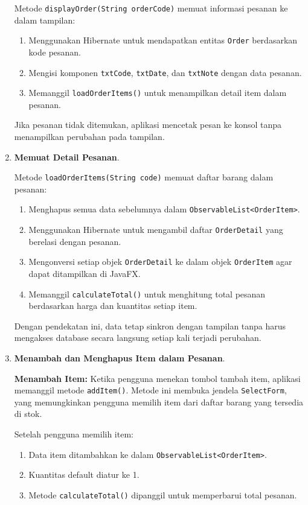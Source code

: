 \begin{enumerate}
	Metode \texttt{displayOrder(String orderCode)} memuat informasi pesanan ke dalam tampilan:
	
	\begin{enumerate}
		\item Menggunakan Hibernate untuk mendapatkan entitas \texttt{Order} berdasarkan kode pesanan.
		\item Mengisi komponen \texttt{txtCode}, \texttt{txtDate}, dan \texttt{txtNote} dengan data pesanan.
		\item Memanggil \texttt{loadOrderItems()} untuk menampilkan detail item dalam pesanan.
	\end{enumerate}
	
	Jika pesanan tidak ditemukan, aplikasi mencetak pesan ke konsol tanpa menampilkan perubahan pada tampilan.
	
	\item \textbf{Memuat Detail Pesanan}.
	
	Metode \texttt{loadOrderItems(String code)} memuat daftar barang dalam pesanan:
	
	\begin{enumerate}
		\item Menghapus semua data sebelumnya dalam \texttt{ObservableList<OrderItem>}.
		\item Menggunakan Hibernate untuk mengambil daftar \texttt{OrderDetail} yang berelasi dengan pesanan.
		\item Mengonversi setiap objek \texttt{OrderDetail} ke dalam objek \texttt{OrderItem} agar dapat ditampilkan di JavaFX.
		\item Memanggil \texttt{calculateTotal()} untuk menghitung total pesanan berdasarkan harga dan kuantitas setiap item.
	\end{enumerate}
	
	Dengan pendekatan ini, data tetap sinkron dengan tampilan tanpa harus mengakses database secara langsung setiap kali terjadi perubahan.
	
	\item \textbf{Menambah dan Menghapus Item dalam Pesanan}.
	
	\textbf{Menambah Item:}  
	Ketika pengguna menekan tombol tambah item, aplikasi memanggil metode \texttt{addItem()}. Metode ini membuka jendela \texttt{SelectForm}, yang memungkinkan pengguna memilih item dari daftar barang yang tersedia di stok.
	
	Setelah pengguna memilih item:
	\begin{enumerate}
		\item Data item ditambahkan ke dalam \texttt{ObservableList<OrderItem>}.
		\item Kuantitas default diatur ke 1.
		\item Metode \texttt{calculateTotal()} dipanggil untuk memperbarui total pesanan.
	\end{enumerate}
	

\end{enumerate}

